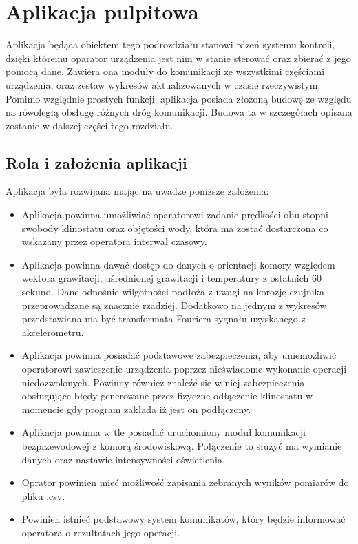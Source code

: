 \graphicspath{{./Aplikacja/images}}

\chapter{Aplikacja pulpitowa}

Aplikacja będąca obiektem tego podrozdziału stanowi rdzeń systemu kontroli, dzięki któremu oparator urządzenia jest nim w stanie sterować oraz zbierać z jego pomocą dane. Zawiera ona moduły do komunikacji ze wszystkimi częściami urządzenia, oraz zestaw wykresów aktualizowanych w czasie rzeczywistym. Pomimo względnie prostych funkcji, aplikacja posiada złożoną budowę ze względu na rówoległą obsługę różnych dróg komunikacji. Budowa ta w szczegółach opisana zostanie  w dalszej części tego rozdziału.

\section{Rola i założenia aplikacji}

Aplikacja była rozwijana mając na uwadze poniższe założenia:
\begin{itemize}
	\item Aplikacja powinna umożliwiać oparatorowi zadanie prędkości obu stopni swobody klinostatu oraz objętości wody, która ma zostać dostarczona co wskazany przez operatora interwał czasowy.
	\item Aplikacja powinna dawać dostęp do danych o orientacji komory względem wektora grawitacji, uśrednionej grawitacji i temperatury z ostatnich 60 sekund. Dane odnośnie wilgotności podłoża z uwagi na korozję czujnika przeprowadzane są znacznie rzadziej. Dodatkowo na jednym z wykresów przedstawiana ma być transformata Fouriera sygnału uzyskanego z akcelerometru.
	\item Aplikacja powinna posiadać podstawowe zabezpieczenia, aby uniemożliwić operatorowi zawieszenie urządzenia poprzez nieświadome wykonanie operacji niedozwolonych. Powinny również znaleźć się w niej zabezpieczenia obsługujące błędy generowane przez fizyczne odłączenie klinostatu w momencie gdy program zakłada iż jest on podłączony.
	\item Aplikacja powinna w tle posiadać uruchomiony moduł komunikacji bezprzewodowej z komorą środowiskową. Połączenie to służyć ma wymianie danych oraz nastawie intensywności oświetlenia.
	\item Oprator powinien mieć możliwość zapisania zebranych wyników pomiarów do pliku .csv.
	\item Powinien istnieć podstawowy system komunikatów, który będzie informować operatora o rezultatach jego operacji.
\end{itemize}

